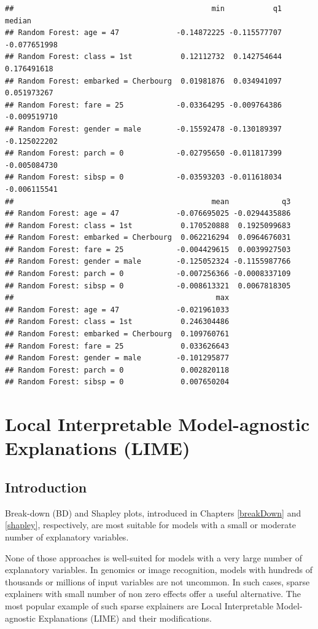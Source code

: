 \documentclass[]{krantz}
\begin{document}
\begin{verbatim}
##                                             min           q1       median
## Random Forest: age = 47             -0.14872225 -0.115577707 -0.077651998
## Random Forest: class = 1st           0.12112732  0.142754644  0.176491618
## Random Forest: embarked = Cherbourg  0.01981876  0.034941097  0.051973267
## Random Forest: fare = 25            -0.03364295 -0.009764386 -0.009519710
## Random Forest: gender = male        -0.15592478 -0.130189397 -0.125022202
## Random Forest: parch = 0            -0.02795650 -0.011817399 -0.005084730
## Random Forest: sibsp = 0            -0.03593203 -0.011618034 -0.006115541
##                                             mean            q3
## Random Forest: age = 47             -0.076695025 -0.0294435886
## Random Forest: class = 1st           0.170520888  0.1925099683
## Random Forest: embarked = Cherbourg  0.062216294  0.0964676031
## Random Forest: fare = 25            -0.004429615  0.0039927503
## Random Forest: gender = male        -0.125052324 -0.1155987766
## Random Forest: parch = 0            -0.007256366 -0.0008337109
## Random Forest: sibsp = 0            -0.008613321  0.0067818305
##                                              max
## Random Forest: age = 47             -0.021961033
## Random Forest: class = 1st           0.246304486
## Random Forest: embarked = Cherbourg  0.109760761
## Random Forest: fare = 25             0.033626643
## Random Forest: gender = male        -0.101295877
## Random Forest: parch = 0             0.002820118
## Random Forest: sibsp = 0             0.007650204
\end{verbatim}

\hypertarget{LIME}{%
\chapter{Local Interpretable Model-agnostic Explanations (LIME)}\label{LIME}}

\hypertarget{LIMEIntroduction}{%
\section{Introduction}\label{LIMEIntroduction}}

Break-down (BD) and Shapley plots, introduced in Chapters \ref{breakDown} and \ref{shapley}, respectively, are most suitable for models with a small or moderate number of explanatory variables.

None of those approaches is well-suited for models with a very large number of explanatory variables. In genomics or image recognition, models with hundreds of thousands or millions of input variables are not uncommon. In such cases, sparse explainers with small number of non zero effects offer a useful alternative. The most popular example of such sparse explainers are Local Interpretable Model-agnostic Explanations (LIME) and their modifications.
\end{document}
